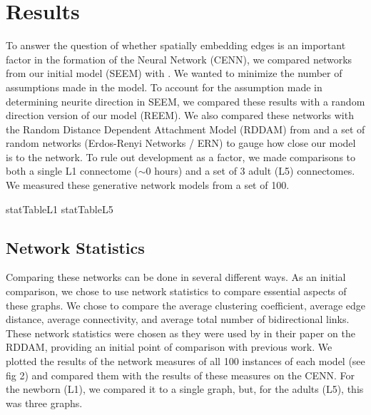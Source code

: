 \section{Results}

To answer the question of whether spatially embedding edges is an important factor in the formation of the \ce Neural Network (CENN), we compared networks from our initial model (SEEM) with \ce. 
We wanted to minimize the number of assumptions made in the model. 
To account for the assumption made in determining neurite direction in SEEM, we compared these results with a random direction version of our model (REEM). 
We also compared these networks with the Random Distance Dependent Attachment Model (RDDAM) from \cite{Itzhack} and a set of random networks (Erdos-Renyi Networks / ERN) to gauge how close our model is to the \ce network. 
To rule out development as a factor, we made comparisons to both a single L1 connectome ($\sim 0$ hours) and a set of 3 adult (L5) connectomes. 
We measured these generative network models from a set of 100.

{statTableL1}
{statTableL5}

\subsection{Network Statistics}
Comparing these networks can be done in several different ways. As an initial comparison, we chose to use network statistics to compare essential aspects of these graphs. We chose to compare the average clustering coefficient, average edge distance, average connectivity, and average total number of bidirectional links. These network statistics were chosen as they were used by \cite{Itzhack} in their paper on the RDDAM, providing an initial point of comparison with previous work. We plotted the results of the network measures of all 100 instances of each model (see fig 2) and compared them with the results of these measures on the CENN. For the newborn (L1), we compared it to a single graph, but, for the adults (L5), this was three graphs.

